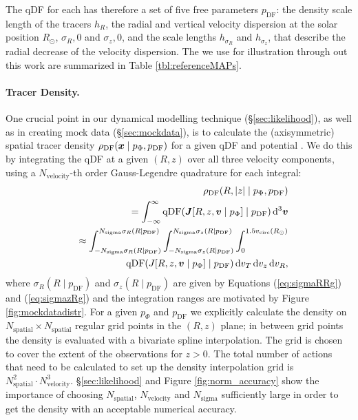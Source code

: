 The qDF for each \MAP has therefore a set of five free parameters $p_\text{DF}$: the density scale length of the tracers $h_R$, the radial and vertical velocity dispersion at the solar position $R_\odot$, $\sigma_R,0$ and $\sigma_z,0$, and the scale lengths $h_{\sigma_R}$ and $h_{\sigma_z}$, that describe the radial decrease of the velocity dispersion. The \MAPs we use for illustration through out this work are summarized in Table \ref{tbl:referenceMAPs}.

\paragraph{Tracer Density.} One crucial point in our dynamical modelling technique (\S\ref{sec:likelihood}), as well as in creating mock data (\S\ref{sec:mockdata}), is to calculate the (axisymmetric) spatial tracer density $\rho_\text{DF}(\boldsymbol{x} \mid p_{\Phi},p_\text{DF})$ for a given qDF and potential . We do this by integrating the qDF at a given $(R,z)$ over all three velocity components, using a $N_\text{velocity}$-th order Gauss-Legendre quadrature for each integral:
\begin{eqnarray}
&&\rho_\text{DF}(R,|z| \mid p_{\Phi},p_\text{DF}) \nonumber\\
&&= \int_{-\infty}^{\infty} \text{qDF}(\boldsymbol{J}[R,z,\boldsymbol{v} \mid p_{\Phi}] \mid p_\text{DF}) \mathop{}\!\mathrm{d^3}\boldsymbol{v}  \label{eq:tracerdensity_general}\\
&&\approx \int_{-N_\text{sigma} \sigma_R(R \mid p_\text{DF})}^{N_\text{sigma} \sigma_R(R \mid p_\text{DF})} \int_{-N_\text{sigma}\sigma_z(R \mid p_\text{DF})}^{N_\text{sigma} \sigma_z(R \mid p_\text{DF})} \int_{0}^{1.5 v_\text{circ}(R_\odot)}  \nonumber\\
& & \hspace{1cm} \text{qDF}(J[R,z,\boldsymbol{v} \mid p_{\Phi}] \mid p_\text{DF}) \mathop{}\!\mathrm{d} v_T \mathop{}\!\mathrm{d} v_z \mathop{}\!\mathrm{d} v_R, \label{eq:tracerdensity}
\end{eqnarray}
where $\sigma_R(R \mid p_\text{DF})$ and $\sigma_z(R \mid p_\text{DF})$ are given by Equations (\ref{eq:sigmaRRg}) and (\ref{eq:sigmazRg}) and the integration ranges are motivated by Figure \ref{fig:mockdatadistr}. For a given $p_\Phi$ and $p_\text{DF}$ we explicitly calculate the density on $N_\text{spatial} \times N_\text{spatial}$ regular grid points in the $(R,z)$ plane; in between grid points the density is evaluated with a bivariate spline interpolation. The grid is chosen to cover the extent of the observations for $z>0$. The total number of actions that need to be calculated to set up the density interpolation grid is $N_\text{spatial}^2 \cdot N_\text{velocity}^3$. \S\ref{sec:likelihood} and Figure \ref{fig:norm_accuracy} show the importance of choosing $N_\text{spatial}$, $N_\text{velocity}$ and $N_\text{sigma}$ sufficiently large in order to get the density with an acceptable numerical accuracy. 

